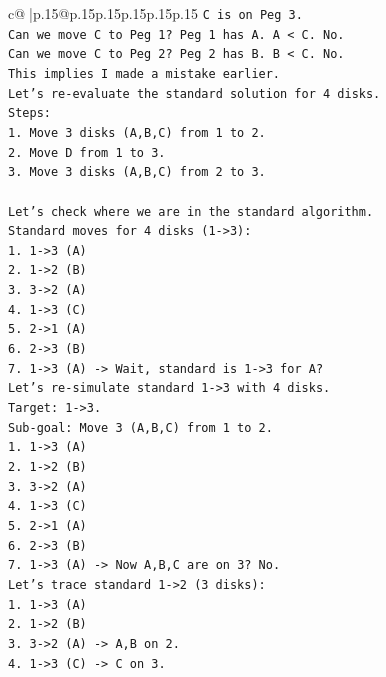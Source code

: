\documentclass{article}
\begin{document}
{\begin{supertabular}{c@{$\;$}|p{.15\linewidth}@{}p{.15\linewidth}p{.15\linewidth}p{.15\linewidth}p{.15\linewidth}p{.15\linewidth}}
{{{\texttt{C is on Peg 3.} \\
\texttt{Can we move C to Peg 1? Peg 1 has A. A < C. No.} \\
\texttt{Can we move C to Peg 2? Peg 2 has B. B < C. No.} \\
\texttt{This implies I made a mistake earlier.} \\
\texttt{Let's re{-}evaluate the standard solution for 4 disks.} \\
\texttt{Steps:} \\
\texttt{1. Move 3 disks (A,B,C) from 1 to 2.} \\
\texttt{2. Move D from 1 to 3.} \\
\texttt{3. Move 3 disks (A,B,C) from 2 to 3.} \\
\\ 
\texttt{Let's check where we are in the standard algorithm.} \\
\texttt{Standard moves for 4 disks (1{-}>3):} \\
\texttt{1. 1{-}>3 (A)} \\
\texttt{2. 1{-}>2 (B)} \\
\texttt{3. 3{-}>2 (A)} \\
\texttt{4. 1{-}>3 (C)} \\
\texttt{5. 2{-}>1 (A)} \\
\texttt{6. 2{-}>3 (B)} \\
\texttt{7. 1{-}>3 (A) {-}> Wait, standard is 1{-}>3 for A?} \\
\texttt{Let's re{-}simulate standard 1{-}>3 with 4 disks.} \\
\texttt{Target: 1{-}>3.} \\
\texttt{Sub{-}goal: Move 3 (A,B,C) from 1 to 2.} \\
\texttt{1. 1{-}>3 (A)} \\
\texttt{2. 1{-}>2 (B)} \\
\texttt{3. 3{-}>2 (A)} \\
\texttt{4. 1{-}>3 (C)} \\
\texttt{5. 2{-}>1 (A)} \\
\texttt{6. 2{-}>3 (B)} \\
\texttt{7. 1{-}>3 (A) {-}> Now A,B,C are on 3? No.} \\
\texttt{Let's trace standard 1{-}>2 (3 disks):} \\
\texttt{1. 1{-}>3 (A)} \\
\texttt{2. 1{-}>2 (B)} \\
\texttt{3. 3{-}>2 (A) {-}> A,B on 2.} \\
\texttt{4. 1{-}>3 (C) {-}> C on 3.} \\
}}}
\end{supertabular}}
\end{document}
